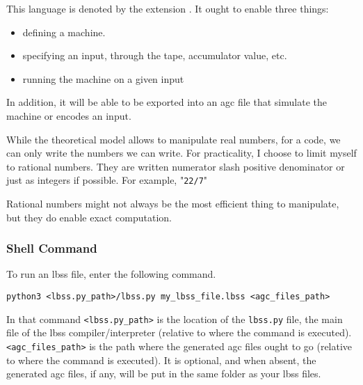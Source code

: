 This language is denoted by the extension \extensionRLTM.
It ought to enable three things:

\begin{itemize}
	\item defining a machine.
	\item specifying an input, through the tape, accumulator value, etc.
	\item running the machine on a given input
\end{itemize}

In addition, it will be able to be exported into an agc file that simulate the machine or encodes an input.

%

While the theoretical model allows to manipulate real numbers, for a code, we can only write the numbers we can write.
For practicality, I choose to limit myself to rational numbers.
They are written numerator slash positive denominator or just as integers if possible.
For example, "\texttt{22/7}"

Rational numbers might not always be the most efficient thing to manipulate, but they do enable exact computation.

\subsubsection{Shell Command}
To run an lbss file, enter the following command.
\begin{verbatim}
python3 <lbss.py_path>/lbss.py my_lbss_file.lbss <agc_files_path>
\end{verbatim}
In that command \texttt{<lbss.py_path>} is the location of the \texttt{lbss.py} file, the main file of the lbss compiler/interpreter (relative to where the command is executed).
\texttt{<agc_files_path>} is the path where the generated agc files ought to go (relative to where the command is executed).
It is optional, and when absent, the generated agc files, if any, will be put in the same folder as your lbss files.

